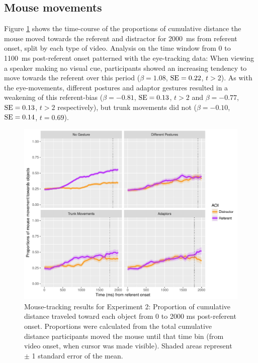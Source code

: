 \documentclass[a4paper,man,natbib]{apa6}
\newcommand{\resultsLM}[3]{$\beta = #1$, $\textnormal{SE} = #2$, $t #3$}
\begin{document}
\subsection{Mouse movements}
Figure \ref{fig:v1_mouse} shows the time-course of the proportions of cumulative distance the mouse moved towards the referent and distractor for 2000~ms from referent onset, split by each type of video.
Analysis on the time window from 0 to 1100~ms post-referent onset patterned with the eye-tracking data:
When viewing a speaker making no visual cue, participants showed an increasing tendency to move towards the referent over this period (\resultsLM{1.08}{0.22}{>2}).
As with the eye-movements, different postures and adaptor gestures resulted in a weakening of this referent-bias (\resultsLM{-0.81}{0.13}{>2} and \resultsLM{-0.77}{0.13}{>2} respectively), but trunk movements did not (\resultsLM{-0.10}{0.14}{=0.69}). 

\begin{figure}[Ht]
  \centering
	\includegraphics[width=\linewidth]{./img/e7_mouset.pdf}
  \caption{Mouse-tracking results for Experiment 2: Proportion of cumulative distance traveled toward each object from 0 to 2000 ms post-referent onset. Proportions were calculated from the total cumulative distance participants moved the mouse until that time bin (from video onset, when cursor was made visible). Shaded areas represent $\pm$ 1 standard error of the mean.}
  \label{fig:v1_mouse}
\end{figure}
\end{document}
